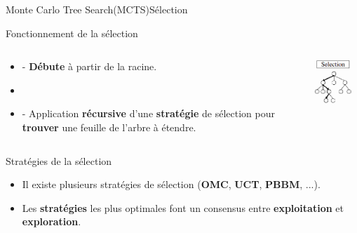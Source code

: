 \begin{frame}{Monte Carlo Tree Search(MCTS)}{Sélection}
	\begin{block}{Fonctionnement de la sélection}
		\begin{columns}
			\begin{column}{7cm}
				\begin{itemize}
					\item - \textbf{Débute} à partir de la racine.
					\item \
					\item - Application \textbf{récursive} d'une \textbf{stratégie} de sélection pour \textbf{trouver} une feuille de l'arbre à étendre. 
				\end{itemize}
			\end{column}
			\begin{column}{4cm}
				\includegraphics[width=3cm]{ressources/MCTS/Selection.png}
			\end{column}
		\end{columns}
	\end{block}
	\begin{block}{Stratégies de la sélection}
		\begin{itemize}
			\item Il existe plusieurs stratégies de sélection (\textbf{OMC}, \textbf{UCT}, \textbf{PBBM}, ...).
			
			\item Les \textbf{stratégies} les plus optimales font un consensus entre \textbf{exploitation} et \textbf{exploration}.
		\end{itemize}
	\end{block}
\end{frame}

